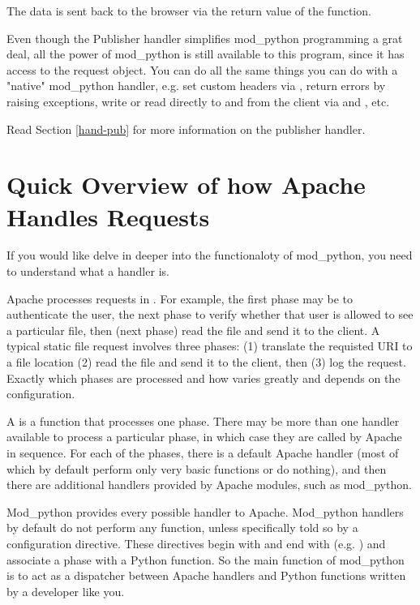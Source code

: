 The data is sent back to the browser via the return value of the
function.

Even though the Publisher handler simplifies mod_python programming a
grat deal, all the power of mod_python is still available to this
program, since it has access to the request object. You can do all the
same things you can do with a "native" mod_python handler, e.g. set
custom headers via , return errors by raising
 exceptions, write or read directly to
and from the client via  and ,
etc.

Read Section \ref{hand-pub} 
for more information on the publisher handler. 

\section{Quick Overview of how Apache Handles Requests\label{tut-overview}}

If you would like delve in deeper into the functionaloty of
mod_python, you need to understand what a handler is.  

Apache processes requests in . For example, the first
phase may be to authenticate the user, the next phase to verify
whether that user is allowed to see a particular file, then (next
phase) read the file and send it to the client. A typical static file
request involves three phases: (1) translate the requisted URI to a
file location (2) read the file and send it to the client, then (3)
log the request. Exactly which phases are processed and how varies
greatly and depends on the configuration.

A  is a function that processes one phase. There may be
more than one handler available to process a particular phase, in
which case they are called by Apache in sequence. For each of the
phases, there is a default Apache handler (most of which by default
perform only very basic functions or do nothing), and then there are
additional handlers provided by Apache modules, such as mod_python.

Mod_python provides every possible handler to Apache. Mod_python
handlers by default do not perform any function, unless specifically
told so by a configuration directive. These directives begin with
 and end with 
(e.g. ) and associate a phase with a Python
function. So the main function of mod_python is to act as a dispatcher
between Apache handlers and Python functions written by a developer
like you.

